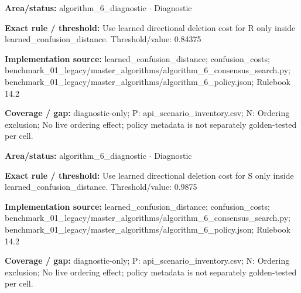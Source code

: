 \begin{tcolorbox}[enhanced,breakable,colback=white,colframe=Muted!45,boxrule=0.45pt,arc=1.5pt,left=6pt,right=6pt,top=5pt,bottom=5pt,title={\texttt{A6-LEARNED-DELETION-R}},title after break={\texttt{A6-LEARNED-DELETION-R}\ (continued)},fonttitle=\headingfont\bfseries\color{Navy},coltitle=Navy]
\textbf{Area/status:} algorithm\_\allowbreak{}6\_\allowbreak{}diagnostic $\boldsymbol{\cdot}$ Diagnostic\par
\smallskip
\textbf{Exact rule / threshold:} Use learned directional deletion cost for R only inside learned\_\allowbreak{}confusion\_\allowbreak{}distance. Threshold/\allowbreak{}value: 0.84375\par
\smallskip
\textbf{Implementation source:} learned\_\allowbreak{}confusion\_\allowbreak{}distance; confusion\_\allowbreak{}costs; benchmark\_\allowbreak{}01\_\allowbreak{}legacy/\allowbreak{}master\_\allowbreak{}algorithms/\allowbreak{}algorithm\_\allowbreak{}6\_\allowbreak{}consensus\_\allowbreak{}search.py; benchmark\_\allowbreak{}01\_\allowbreak{}legacy/\allowbreak{}master\_\allowbreak{}algorithms/\allowbreak{}algorithm\_\allowbreak{}6\_\allowbreak{}policy.json; Rulebook 14.2\par
\smallskip
\textbf{Coverage / gap:} diagnostic-only; P: api\_\allowbreak{}scenario\_\allowbreak{}inventory.csv; N: Ordering exclusion; No live ordering effect; policy metadata is not separately golden-tested per cell.
\end{tcolorbox}
\begin{tcolorbox}[enhanced,breakable,colback=white,colframe=Muted!45,boxrule=0.45pt,arc=1.5pt,left=6pt,right=6pt,top=5pt,bottom=5pt,title={\texttt{A6-LEARNED-DELETION-S}},title after break={\texttt{A6-LEARNED-DELETION-S}\ (continued)},fonttitle=\headingfont\bfseries\color{Navy},coltitle=Navy]
\textbf{Area/status:} algorithm\_\allowbreak{}6\_\allowbreak{}diagnostic $\boldsymbol{\cdot}$ Diagnostic\par
\smallskip
\textbf{Exact rule / threshold:} Use learned directional deletion cost for S only inside learned\_\allowbreak{}confusion\_\allowbreak{}distance. Threshold/\allowbreak{}value: 0.9875\par
\smallskip
\textbf{Implementation source:} learned\_\allowbreak{}confusion\_\allowbreak{}distance; confusion\_\allowbreak{}costs; benchmark\_\allowbreak{}01\_\allowbreak{}legacy/\allowbreak{}master\_\allowbreak{}algorithms/\allowbreak{}algorithm\_\allowbreak{}6\_\allowbreak{}consensus\_\allowbreak{}search.py; benchmark\_\allowbreak{}01\_\allowbreak{}legacy/\allowbreak{}master\_\allowbreak{}algorithms/\allowbreak{}algorithm\_\allowbreak{}6\_\allowbreak{}policy.json; Rulebook 14.2\par
\smallskip
\textbf{Coverage / gap:} diagnostic-only; P: api\_\allowbreak{}scenario\_\allowbreak{}inventory.csv; N: Ordering exclusion; No live ordering effect; policy metadata is not separately golden-tested per cell.
\end{tcolorbox}

